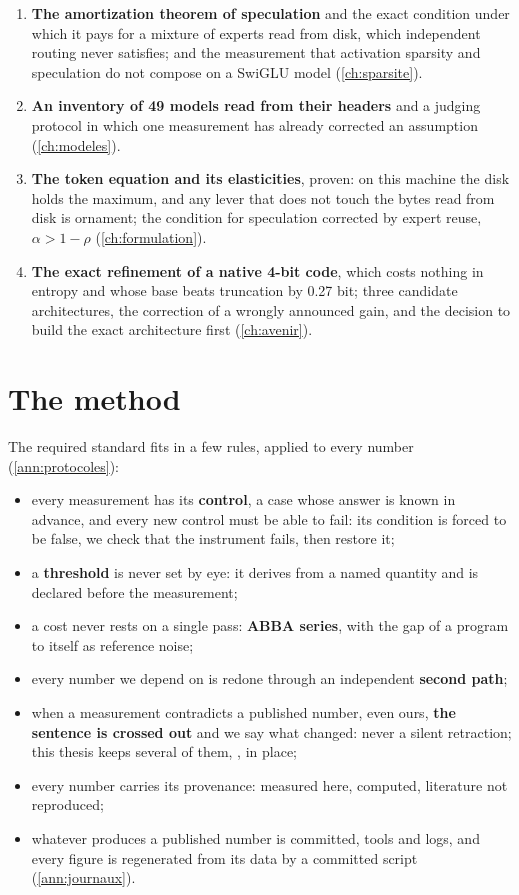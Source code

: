 \begin{enumerate}
\item \textbf{The amortization theorem of speculation} and the exact condition under which it pays for a mixture of experts read from disk, which independent routing never satisfies; and the measurement that activation sparsity and speculation do not compose on a SwiGLU model (\cref{ch:sparsite}).
\item \textbf{An inventory of 49 models read from their headers} and a judging protocol in which one measurement has already corrected an assumption (\cref{ch:modeles}).
\item \textbf{The token equation and its elasticities}, proven: on this machine the disk holds the maximum, and any lever that does not touch the bytes read from disk is ornament; the condition for speculation corrected by expert reuse, $\alpha > 1 - \rho$ (\cref{ch:formulation}).
\item \textbf{The exact refinement of a native 4-bit code}, which costs nothing in entropy and whose base beats truncation by 0.27 bit; three candidate architectures, the correction of a wrongly announced gain, and the decision to build the exact architecture first (\cref{ch:avenir}).
\end{enumerate}

\section{The method}\label{sec:methode}

The required standard fits in a few rules, applied to every number (\cref{ann:protocoles}):
\begin{itemize}
\item every measurement has its \textbf{control}, a case whose answer is known in advance, and every new control must be able to fail: its condition is forced to be false, we check that the instrument fails, then restore it;
\item a \textbf{threshold} is never set by eye: it derives from a named quantity and is declared before the measurement;
\item a cost never rests on a single pass: \textbf{ABBA series}, with the gap of a program to itself as reference noise;
\item every number we depend on is redone through an independent \textbf{second path};
\item when a measurement contradicts a published number, even ours, \textbf{the sentence is crossed out} and we say what changed: never a silent retraction; this thesis keeps several of them, , in place;
\item every number carries its provenance: \mes{} measured here, \calc{} computed, \litt{} literature not reproduced;
\item whatever produces a published number is committed, tools and logs, and every figure is regenerated from its data by a committed script (\cref{ann:journaux}).
\end{itemize}

